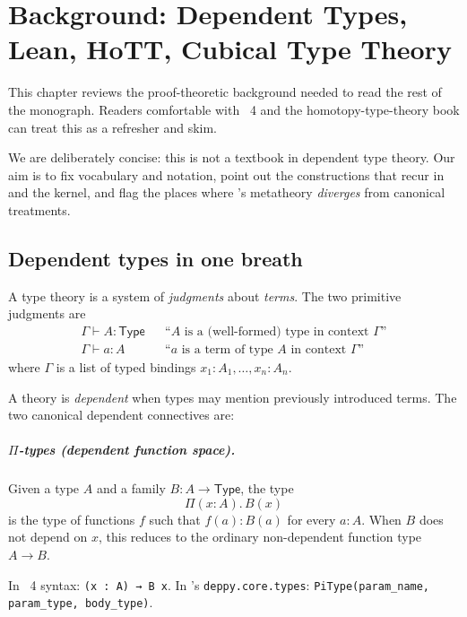 \chapter{Background: Dependent Types, Lean, HoTT, Cubical Type Theory}
\label{ch:dependent}

This chapter reviews the proof-theoretic background needed to read
the rest of the monograph.  Readers comfortable with \Lean~4
\citep{LeanFour} and the homotopy-type-theory book \citep{HoTT} can
treat this as a refresher and skim.

We are deliberately concise: this is not a textbook in dependent
type theory.  Our aim is to fix vocabulary and notation, point out
the constructions that recur in \PSDL{} and the kernel, and flag the
places where \Deppy{}'s metatheory \emph{diverges} from canonical
treatments.

\section{Dependent types in one breath}
\label{sec:dt-one-breath}

A type theory is a system of \emph{judgments} about \emph{terms}.
The two primitive judgments are
\begin{align*}
  \Gamma \vdash A : \mathsf{Type} && \text{``$A$ is a (well-formed) type in context $\Gamma$''}\\
  \Gamma \vdash a : A && \text{``$a$ is a term of type $A$ in context $\Gamma$''}
\end{align*}
where $\Gamma$ is a list of typed bindings $x_1 : A_1, \dots, x_n : A_n$.

A theory is \emph{dependent} when types may mention previously
introduced terms.  The two canonical dependent connectives are:

\paragraph{$\Pi$-types (dependent function space).}
Given a type $A$ and a family $B : A \to \mathsf{Type}$, the type
\begin{equation*}
  \Pi(x : A).\, B(x)
\end{equation*}
is the type of functions $f$ such that $f(a) : B(a)$ for every $a :
A$.  When $B$ does not depend on $x$, this reduces to the ordinary
non-dependent function type $A \to B$.

In \Lean{}~4 syntax: \verb|(x : A) → B x|.  In \Deppy{}'s
\texttt{deppy.core.types}: \verb|PiType(param_name, param_type, body_type)|.

